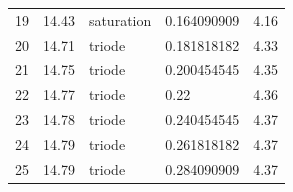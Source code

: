 \documentclass{report}
\begin{document}
\begin{table}[H]
\begin{tabular}{@{}lllll@{}}
		19       & 14.43    & saturation        & 0.164090909 & 4.16     \\
		20       & 14.71    & triode            & 0.181818182 & 4.33     \\
		21       & 14.75    & triode            & 0.200454545 & 4.35     \\
		22       & 14.77    & triode            & 0.22        & 4.36     \\
		23       & 14.78    & triode            & 0.240454545 & 4.37     \\
		24       & 14.79    & triode            & 0.261818182 & 4.37     \\
		25       & 14.79    & triode            & 0.284090909 & 4.37     \\ \bottomrule
	\end{tabular}
\end{table}
\end{document}
